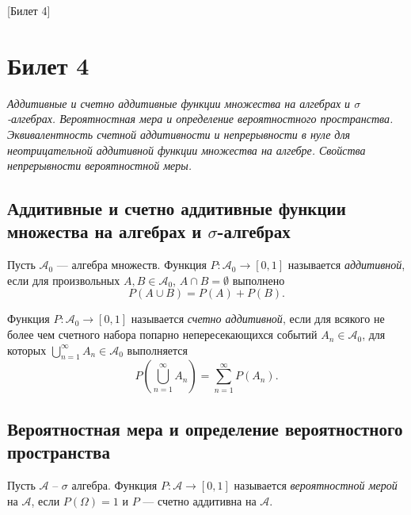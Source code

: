 [Билет 4]

\section{Билет 4}

\begin{center}
    \it Аддитивные и счетно аддитивные функции множества на алгебрах и $\sigma$-алгебрах.
    Вероятностная мера и определение вероятностного пространства.
    Эквивалентность счетной аддитивности и непрерывности в нуле для неотрицательной аддитивной функции множества на алгебре.
    Свойства непрерывности вероятностной меры.
\end{center}

\sectionbreak
\subsection{Аддитивные и счетно аддитивные функции множества на алгебрах и $\sigma$-алгебрах}

\begin{definition}
    Пусть $\mathcal{A}_0$ --- алгебра множеств.
    Функция $P \colon \mathcal{A}_0 \to [0, 1]$ называется {\it аддитивной}, если для произвольных $A, B \in \mathcal{A}_0$, $A \cap B = \emptyset$ выполнено
    \[
        P(A\cup B) = P(A) + P(B).
    \]
\end{definition}

\begin{definition}
    Функция $P \colon \mathcal{A}_0 \to [0, 1]$ называется {\it счетно аддитивной}, если для всякого не более чем счетного набора попарно непересекающихся событий $A_n \in \mathcal{A}_{0}$, для которых $\bigcup\limits_{n = 1}^\infty A_n \in \mathcal{A}_0$
    выполняется
    \[
        P\left( \bigcup\limits_{n = 1}^\infty A_n \right) = \sum_{n = 1}^\infty P(A_n).
    \]
\end{definition}

\sectionbreak
\subsection{Вероятностная мера и определение вероятностного пространства}

\begin{definition}
    Пусть $\mathcal{A}$ -- $\sigma$ алгебра. Функция $P\colon\mathcal{A}\to[0, 1]$ называется {\it вероятностной мерой} на $\mathcal{A}$, если $P(\Omega) = 1$ и $P$ --- счетно аддитивна на $\mathcal{A}$.
\end{definition}

